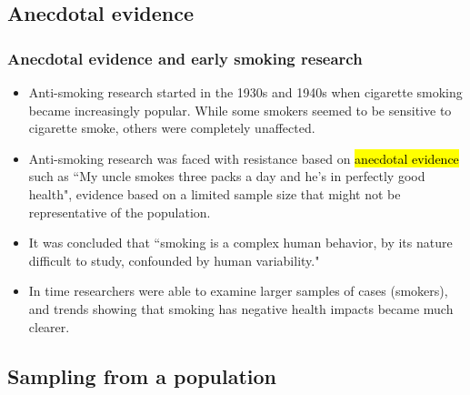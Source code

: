 
\subsection{Anecdotal evidence}


\begin{frame}
\frametitle{Anecdotal evidence and early smoking research}

\begin{itemize}

\item Anti-smoking research started in the 1930s and 1940s when cigarette smoking became increasingly popular. While some smokers seemed to be sensitive to cigarette smoke, others were completely unaffected.

\item Anti-smoking research was faced with resistance based on \hl{anecdotal evidence} such as ``My uncle smokes three packs a day and he's in perfectly good health", evidence based on a limited sample size that might not be representative of the population.

\item It was concluded that ``smoking is a complex human behavior, by its nature difficult to study, confounded by human variability."

\item In time researchers were able to examine larger samples of cases (smokers), and trends showing that smoking has negative health impacts became much clearer.

\end{itemize}


\end{frame}


\subsection{Sampling from a population}

